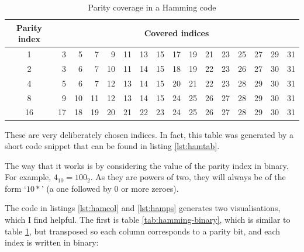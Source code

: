 \documentclass[a4paper,11pt]{article}
\begin{document}
\begin{table}[H]
\begin{center}
    \begin{tabular}{crrrrrrrrrrrrrrr}
    \toprule
    Parity index & \multicolumn{15}{c}{Covered indices} \\
    \midrule
    1 & 3 & 5 & 7 & 9 & 11 & 13 & 15 & 17 & 19 & 21 & 23 & 25 & 27 & 29 & 31 \\
    2 & 3 & 6 & 7 & 10 & 11 & 14 & 15 & 18 & 19 & 22 & 23 & 26 & 27 & 30 & 31 \\
    4 & 5 & 6 & 7 & 12 & 13 & 14 & 15 & 20 & 21 & 22 & 23 & 28 & 29 & 30 & 31 \\
    8 & 9 & 10 & 11 & 12 & 13 & 14 & 15 & 24 & 25 & 26 & 27 & 28 & 29 & 30 & 31 \\
    16 & 17 & 18 & 19 & 20 & 21 & 22 & 23 & 24 & 25 & 26 & 27 & 28 & 29 & 30 & 31 \\
    \bottomrule
    \end{tabular}
    \caption{Parity coverage in a Hamming code}\label{tab:hamming-indices}
\end{center}
\end{table}

    These are very deliberately chosen indices. In fact, this table was
    generated by a short code snippet that can be found in listing
    \ref{lst:hamtab}.

    The way that it works is by considering the value of the parity index in
    binary. For example, $4_{10}=100_{2}$. As they are powers of two, they will
    always be of the form `$10*$' (a one followed by 0 or more zeroes).

    The code in listings \ref{lst:hamcol} and \ref{lst:hamps} generates two
    visualisations, which I find helpful. The first is table
    \ref{tab:hamming-binary}, which is similar to table
    \ref{tab:hamming-indices}, but transposed so each column corresponds to a
    parity bit, and each index is written in binary:
\end{document}
